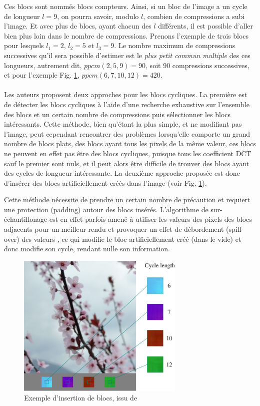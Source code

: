 \documentclass[utf8]{stageM2R} %
\begin{document}
Ces blocs sont nommés blocs compteurs. Ainsi, si un bloc de l'image a un cycle de longueur $l=9$, on pourra savoir, modulo $l$, combien de compressions a subi l'image. Et avec plus de blocs, ayant chacun des $l$ différents, il est possible d'aller bien plus loin dans le nombre de compressions. Prenons l'exemple de trois blocs pour lesquels $l_{1} = 2$, $l_{2} = 5$ et $l_{3} = 9$. Le nombre maximum de compressions successives qu'il sera possible d'estimer est le \textit{plus petit commun multiple} des ces longueurs, autrement dit, $ppcm(2, 5, 9) = 90$, soit 90 compressions successives, et pour l'exemple Fig. \ref{fig:insertion_blocs}, $ppcm(6, 7, 10, 12) = 420$.

\paragraph{}
Les auteurs proposent deux approches pour les blocs cycliques. La première est de détecter les blocs cycliques à l'aide d'une recherche exhaustive sur l'ensemble des blocs et un certain nombre de compressions puis sélectionner les blocs intéressants. Cette méthode, bien qu'étant la plus simple, et ne modifiant pas l'image, peut cependant rencontrer des problèmes lorsqu'elle comporte un grand nombre de blocs plats, des blocs ayant tous les pixels de la même valeur, ces blocs ne peuvent en effet pas être des blocs cycliques, puisque tous les coefficient DCT sauf le premier sont nuls, et il peut alors être difficile de trouver des blocs ayant des cycles de longueur intéressante. La deuxième approche proposée est donc d'insérer des blocs artificiellement créés dans l'image (voir Fig. \ref{fig:insertion_blocs}). 

Cette méthode nécessite de prendre un certain nombre de précaution et requiert une protection (padding) autour des blocs insérés. L'algorithme de sur-échantillonage est en effet parfois amené à utiliser les valeurs des pixels des blocs adjacents pour un meilleur rendu et provoquer un effet de débordement (spill over) des valeurs \cite{carnein2015forensics}, ce qui modifie le bloc artificiellement créé (dans le vide) et donc modifie son cycle, rendant nulle son information.

\begin{figure}
  \begin{center}
    \includegraphics[width=80mm]{images/insertion_blocs}
    \caption{Exemple d'insertion de blocs, issu de \cite{CarneinSB2016TelltaleWatermarks}}
    \label{fig:insertion_blocs}
  \end{center}
\end{figure}
\end{document}
